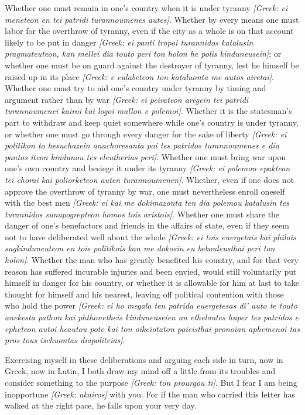  Whether one must remain in one's country when it is under tyranny \textit{[Greek: ei meneteon en tei patridi turannoumenes autes]}. Whether by every means one must labor for the overthrow of tyranny, even if the city as a whole is on that account likely to be put in danger \textit{[Greek: ei panti tropoi turannidos katalusin pragmateuteon, kan mellei dia touto peri ton holon he polis kinduneusein]}; or whether one must be on guard against the destroyer of tyranny, lest he himself be raised up in its place \textit{[Greek: e eulabeteon ton kataluonta me autos airetai]}. Whether one must try to aid one's country under tyranny by timing and argument rather than by war \textit{[Greek: ei peirateon aregein tei patridi turannoumenei kairoi kai logoi mallon e polemoi]}. Whether it is the statesman's part to withdraw and keep quiet somewhere while one's country is under tyranny, or whether one must go through every danger for the sake of liberty \textit{[Greek: ei politikon to hesuchazein anachoresanta poi tes patridos turannoumenes e dia pantos iteon kindunou tes eleutherias peri]}. Whether one must bring war upon one's own country and besiege it under its tyranny \textit{[Greek: ei polemon epakteon tei chorai kai poliorketeon auten turannoumenen]}. Whether, even if one does not approve the overthrow of tyranny by war, one must nevertheless enroll oneself with the best men \textit{[Greek: ei kai me dokimazonta ten dia polemou katalusin tes turannidos sunapogrepteon homos tois aristois]}. Whether one must share the danger of one's benefactors and friends in the affairs of state, even if they seem not to have deliberated well about the whole \textit{[Greek: ei tois euergetais kai philois sugkinduneuteon en tois politikois kan me dokosin eu bebouleusthai peri ton holon]}. Whether the man who has greatly benefited his country, and for that very reason has suffered incurable injuries and been envied, would still voluntarily put himself in danger for his country, or whether it is allowable for him at last to take thought for himself and his nearest, leaving off political contention with those who hold the power \textit{[Greek: ei ho megala ten patrida euergetesas di' auto te touto anekesta pathon kai phthonetheis kinduneuseien an etheloutes huper tes patridos e epheteon autoi heautou pote kai ton oikeiotaton poieisthai pronoian aphemenoi tas pros tous ischuontas diapoliteias]}.

 Exercising myself in these deliberations and arguing each side in turn, now in Greek, now in Latin, I both draw my mind off a little from its troubles and consider something to the purpose \textit{[Greek: ton prourgou ti]}. But I fear I am being inopportune \textit{[Greek: akairos]} with you. For if the man who carried this letter has walked at the right pace, he falls upon your very day.
